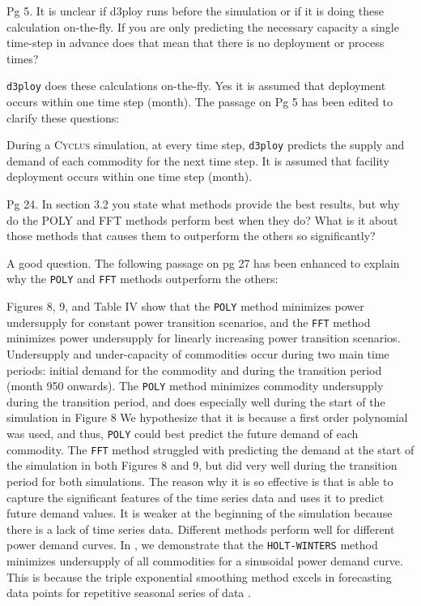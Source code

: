 \documentclass[answers,11pt]{exam}
\newcommand{\Cyclus}{\textsc{Cyclus}\xspace}%
\newcommand{\deploy}{\texttt{d3ploy}\xspace}%
\begin{document}
\begin{questions}
\question
Pg 5. It is unclear if d3ploy runs before the simulation or if it is 
doing these calculation on-the-fly. If you are only predicting the 
necessary capacity a single time-step in advance does that mean that 
there is no deployment or process times?

\begin{solution}
\deploy does these calculations on-the-fly. Yes it is assumed that deployment occurs 
within one time step (month). The passage on Pg 5 has been edited to clarify these 
questions: 

During a \Cyclus simulation, at every time step, \deploy 
predicts the supply and demand of each commodity for the next time 
step. 
It is assumed that facility deployment occurs 
within one time step (month). 
\end{solution}

\question
Pg 24. In section 3.2 you state what methods provide the best results, but why do the 
POLY and FFT methods perform best when they do? What is it about those methods that 
causes them to outperform the others so significantly?

\begin{solution}
A good question. The following passage on pg 27 has been enhanced to explain 
why the \texttt{POLY} and \texttt{FFT} methods outperform the others: 

Figures 8, 9, and Table 
IV show that the \texttt{POLY} method 
minimizes power undersupply for constant power transition scenarios, 
and the \texttt{FFT} method minimizes power undersupply for linearly increasing 
power transition scenarios. 
Undersupply and under-capacity of commodities occur during two main time periods: 
initial demand for the commodity and during the transition period (month 950 onwards).
The \texttt{POLY} method minimizes commodity undersupply during the transition period, 
and does especially well during the start of the simulation in Figure 8 
We hypothesize that it is because a first order polynomial was used, and thus, \texttt{POLY}
could best predict the future demand of each commodity. 
The \texttt{FFT} method struggled with predicting the demand at the start of the simulation
in both Figures 8 and 9, 
but did very well during the transition period for both simulations. 
The reason why it is so effective is that is able to capture the significant features 
of the time series data and uses it to predict future demand values. 
It is weaker at the beginning of the simulation because there is a lack of time series data. 
Different methods perform well for different power demand curves. In 
\cite{chee_demonstration_2019}, we demonstrate that the \texttt{HOLT-WINTERS} method 
minimizes undersupply of all commodities for a sinusoidal power demand curve. 
This is because the triple exponential smoothing
method excels in forecasting data points for repetitive seasonal
series of data \cite{chee_demonstration_2019}.
\end{solution}


\end{questions}
\end{document}
